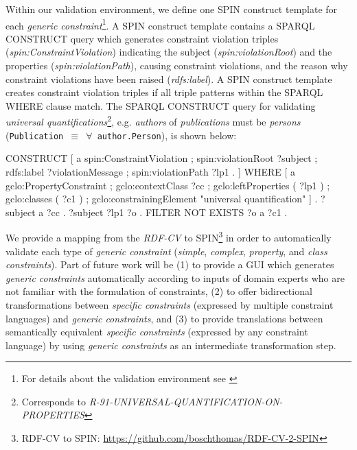 \documentclass{llncs}
\newcommand{\ms}[1]{\texttt{#1}}
\begin{document}
Within our validation environment, we define one SPIN construct template for each \emph{generic constraint}\footnote{For details about the validation environment see \cite{BoschEckert2014-2}}.
A SPIN construct template contains a SPARQL CONSTRUCT query which generates constraint violation triples (\emph{spin:ConstraintViolation}) indicating the subject (\emph{spin:violationRoot}) and the properties (\emph{spin:violationPath}), causing constraint violations, and the reason why constraint violations have been raised (\emph{rdfs:label}).
A SPIN construct template creates constraint violation triples if all triple patterns within the SPARQL WHERE clause match.
The SPARQL CONSTRUCT query for validating \emph{universal quantifications}\footnote{Corresponds to \emph{R-91-UNIVERSAL-QUANTIFICATION-ON-PROPERTIES}}, e.g. \emph{authors} of \emph{publications} must be \emph{persons} (\ms{Publication $\equiv$ $\forall$ author.Person}), is shown below:

\begin{ex}
CONSTRUCT {
    [   a spin:ConstraintViolation ; spin:violationRoot ?subject ;
        rdfs:label ?violationMessage ; spin:violationPath ?lp1 . ] }
WHERE {	  
    [   a gclo:PropertyConstraint ;
        gclo:contextClass ?cc ;
        gclo:leftProperties ( ?lp1 ) ;
        gclo:classes ( ?c1 ) ;
        gclo:constrainingElement "universal quantification" ] .
    ?subject a ?cc .
    ?subject ?lp1 ?o .
    FILTER NOT EXISTS { ?o a ?c1 } . }
\end{ex}

We provide a mapping from the \emph{RDF-CV} to SPIN\footnote{RDF-CV to SPIN: \url{https://github.com/boschthomas/RDF-CV-2-SPIN}} in order to automatically validate each type of \emph{generic constraint} (\emph{simple}, \emph{complex}, \emph{property}, and \emph{class constraints}).
Part of future work will be 
(1) to provide a GUI which generates \emph{generic constraints} automatically according to inputs of domain experts who are not familiar with the formulation of constraints,
(2) to offer bidirectional transformations between \emph{specific constraints} (expressed by multiple constraint languages) and \emph{generic constraints}, and
(3) to provide translations between semantically equivalent \emph{specific constraints} (expressed by any constraint language) by using \emph{generic constraints} as an intermediate transformation step.
\end{document}
